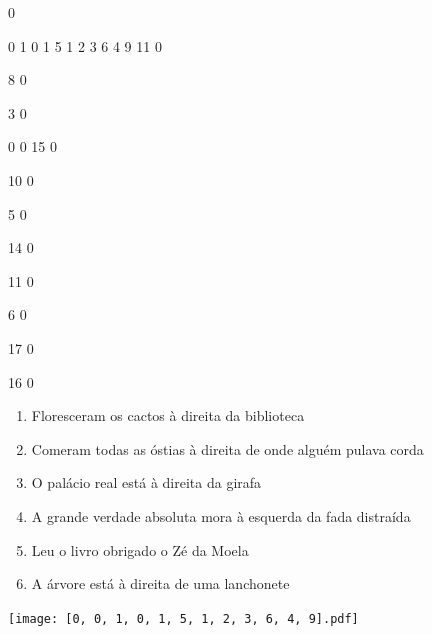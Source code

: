 \documentclass[12pt]{article}
\begin{document}
		\vfill  
		  
{
	0	%

	0	%
	1	%
	0	%
	1	%
	5	%
	1	%
	2	%
	3	%
	6	%
	4	%
	9	%
	11	%
	0	%

	8	%
	0	%

	3	%
	0	%

	0	%
	0	%
	15	%
	0	%

	10	%
	0	%

	5	%
	0	%

	14	%
	0	%

	11	%
	0	%

	6	%
	0	%

	17	%
	0	%

	16	%
	0	%

}	  
		    	

		 

\pagebreak


	\begin{enumerate}
		  \sffamily %
		  \large %


\vfill \item
Floresceram os cactos	%
à direita
da biblioteca	%

\vfill \item
Comeram todas as óstias	%
à direita
de onde alguém pulava corda	%

\vfill \item
O palácio real está	%
à direita
da girafa	%

\vfill \item
A grande verdade absoluta mora	%
à esquerda
da fada distraída	%

\vfill \item
Leu o livro obrigado	%
o Zé da Moela	%

\vfill \item
A árvore está	%
à direita
de uma lanchonete	%
	\end{enumerate}
		  
		  \hfill

		  \vfill

\texttt{[image: [0, 0, 1, 0, 1, 5, 1, 2, 3, 6, 4, 9].pdf]}


	\hfill	  	  
\end{document}
